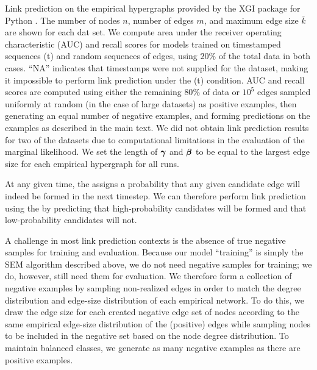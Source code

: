 \begin{table*}
    \centering
    
    
    \caption{
        Link prediction on the empirical hypergraphs provided by the XGI package for Python \cite{landryXGIPythonPackage2023}. 
        The number of nodes $n$, number of edges $m$, and maximum edge size $\bar{k}$ are shown for each dat set. 
        We compute area under the receiver operating characteristic (AUC) and recall scores for models trained on timestamped sequences (t) and random sequences of edges, using $20\%$ of the total data in both cases. 
        ``NA'' indicates that timestamps were not supplied for the dataset, making it impossible to perform link prediction under the (t) condition. 
        AUC and recall scores are computed using either the remaining $80\%$ of data or $10^5$ edges sampled uniformly at random (in the case of large datasets) as positive examples, then generating an equal number of negative examples, and forming predictions on the examples as described in the main text. 
        We did not obtain link prediction results for two of the datasets due to computational limitations in the evaluation of the marginal likelihood. 
        We set the length of $\boldsymbol{\gamma}$ and $\boldsymbol{\beta}$ to be equal to the largest edge size for each empirical hypergraph for all runs.
        }
    \label{tab:lp_results}
\end{table*}
    
At any given time, the \model assigns a probability that any given candidate edge will indeed be formed in the next timestep. 
We can therefore perform link prediction using the \model by predicting that high-probability candidates will be formed and that low-probability candidates will not.

A challenge in most link prediction contexts is the absence of true negative samples for training and evaluation. 
Because our model ``training'' is simply the SEM algorithm described above, we do not need negative samples for training; we do, however, still need them for evaluation. 
We therefore form a collection of negative examples by sampling non-realized edges in order to match the degree distribution and edge-size distribution of each empirical network. 
To do this, we draw the edge size for each created negative edge set of nodes according to the same empirical edge-size distribution of the (positive) edges while sampling nodes to be included in the negative set based on the node degree distribution. 
To maintain balanced classes, we generate as many negative examples as there are positive examples. 

